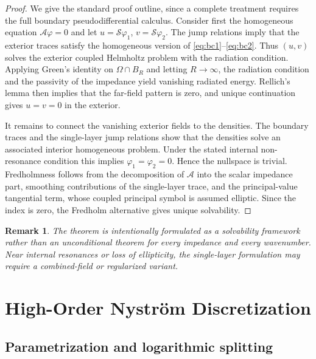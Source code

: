 \documentclass[11pt]{article}
\numberwithin{equation}{section}
\newtheorem{remark}{Remark}[section]
\begin{document}
\begin{proof}
We give the standard proof outline, since a complete treatment requires the full boundary pseudodifferential calculus. Consider first the homogeneous equation $\mathcal A\varphi=0$ and let $u=\mathcal S\varphi_1$, $v=\mathcal S\varphi_2$. The jump relations imply that the exterior traces satisfy the homogeneous version of \eqref{eq:bc1}--\eqref{eq:bc2}. Thus $(u,v)$ solves the exterior coupled Helmholtz problem with the radiation condition. Applying Green's identity on $\Omega\cap B_R$ and letting $R\to\infty$, the radiation condition and the passivity of the impedance yield vanishing radiated energy. Rellich's lemma then implies that the far-field pattern is zero, and unique continuation gives $u=v=0$ in the exterior.

It remains to connect the vanishing exterior fields to the densities. The boundary traces and the single-layer jump relations show that the densities solve an associated interior homogeneous problem. Under the stated internal non-resonance condition this implies $\varphi_1=\varphi_2=0$. Hence the nullspace is trivial. Fredholmness follows from the decomposition of $\mathcal A$ into the scalar impedance part, smoothing contributions of the single-layer trace, and the principal-value tangential term, whose coupled principal symbol is assumed elliptic. Since the index is zero, the Fredholm alternative gives unique solvability.
\end{proof}

\begin{remark}
The theorem is intentionally formulated as a solvability framework rather than an unconditional theorem for every impedance and every wavenumber. Near internal resonances or loss of ellipticity, the single-layer formulation may require a combined-field or regularized variant.
\end{remark}

\section{High-Order Nystr\"om Discretization}

\subsection{Parametrization and logarithmic splitting}
\end{document}
